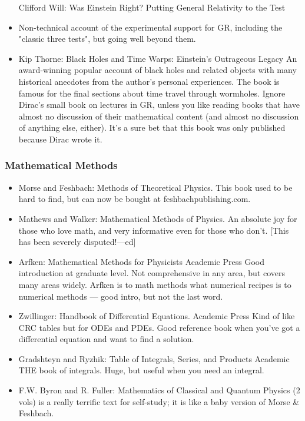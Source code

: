 \documentclass[10pt,a4paper]{book}
\theoremstyle{definition}
\begin{document}
\begin{itemize}
Clifford Will: Was Einstein Right? Putting General Relativity to the Test
\item Non-technical account of the experimental support for GR, including the "classic three tests", but going well beyond them.
\item Kip Thorne: Black Holes and Time Warps: Einstein's Outrageous Legacy
An award-winning popular account of black holes and related objects with many historical anecdotes from the author's personal experiences.  The book is famous for the final sections about time travel through wormholes.
Ignore Dirac's small book on lectures in GR, unless you like reading books that have almost no discussion of their mathematical content (and almost no discussion of anything else, either).  It's a sure bet that this book was only published because Dirac wrote it.
\end{itemize}


\subsubsection{Mathematical Methods}
\begin{itemize}
\item 
Morse and Feshbach: Methods of Theoretical Physics.  This book used to be hard to find, but can now be bought at feshbachpublishing.com.
\item Mathews and Walker: Mathematical Methods of Physics.  An absolute joy for those who love math, and very informative even for those who don't.  [This has been severely disputed!—ed]

\item Arfken: Mathematical Methods for Physicists Academic Press
Good introduction at graduate level.  Not comprehensive in any area, but covers many areas widely.  Arfken is to math methods what numerical recipes is to numerical methods — good intro, but not the last word.
\item Zwillinger: Handbook of Differential Equations. Academic Press
Kind of like CRC tables but for ODEs and PDEs.  Good reference book when you've got a differential equation and want to find a solution.
\item Gradshteyn and Ryzhik: Table of Integrals, Series, and Products Academic
THE book of integrals.  Huge, but useful when you need an integral.
\item F.W. Byron and R. Fuller: Mathematics of Classical and Quantum Physics (2 vols)
is a really terrific text for self-study; it is like a baby version of Morse \& Feshbach.
\end{itemize}
\end{document}
